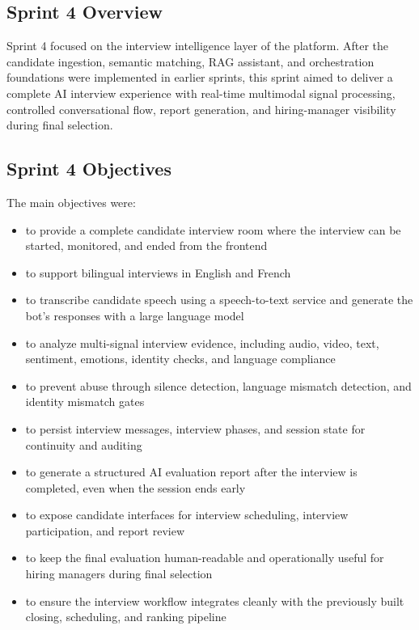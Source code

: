 \subsection{Sprint 4 Overview}

Sprint 4 focused on the interview intelligence layer of the platform. After the candidate ingestion, semantic matching, RAG assistant, and orchestration foundations were implemented in earlier sprints, this sprint aimed to deliver a complete AI interview experience with real-time multimodal signal processing, controlled conversational flow, report generation, and hiring-manager visibility during final selection.

\subsection{Sprint 4 Objectives}
\label{sec:sprint4:objectives}

The main objectives were:
\begin{itemize}
    \item to provide a complete candidate interview room where the interview can be started, monitored, and ended from the frontend
    \item to support bilingual interviews in English and French
    \item to transcribe candidate speech using a speech-to-text service and generate the bot's responses with a large language model
    \item to analyze multi-signal interview evidence, including audio, video, text, sentiment, emotions, identity checks, and language compliance
    \item to prevent abuse through silence detection, language mismatch detection, and identity mismatch gates
    \item to persist interview messages, interview phases, and session state for continuity and auditing
    \item to generate a structured AI evaluation report after the interview is completed, even when the session ends early
    \item to expose candidate interfaces for interview scheduling, interview participation, and report review
    \item to keep the final evaluation human-readable and operationally useful for hiring managers during final selection
    \item to ensure the interview workflow integrates cleanly with the previously built closing, scheduling, and ranking pipeline
\end{itemize}

